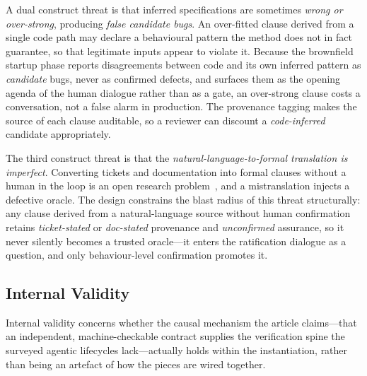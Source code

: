 A dual construct threat is that inferred specifications are sometimes \emph{wrong or over-strong}, producing \emph{false candidate bugs}. An over-fitted clause derived from a single code path may declare a behavioural pattern the method does not in fact guarantee, so that legitimate inputs appear to violate it. Because the brownfield startup phase reports disagreements between code and its own inferred pattern as \emph{candidate} bugs, never as confirmed defects, and surfaces them as the opening agenda of the human dialogue rather than as a gate, an over-strong clause costs a conversation, not a false alarm in production. The provenance tagging makes the source of each clause auditable, so a reviewer can discount a \emph{code-inferred} candidate appropriately.

The third construct threat is that the \emph{natural-language-to-formal translation is imperfect}. Converting tickets and documentation into formal clauses without a human in the loop is an open research problem~\cite{cosler2023nl2spec,endres2024nl2postcond,ma2025specgen}, and a mistranslation injects a defective oracle. The design constrains the blast radius of this threat structurally: any clause derived from a natural-language source without human confirmation retains \emph{ticket-stated} or \emph{doc-stated} provenance and \emph{unconfirmed} assurance, so it never silently becomes a trusted oracle---it enters the ratification dialogue as a question, and only behaviour-level confirmation promotes it.

\subsection{Internal Validity}
\label{subsec:threats-internal}

Internal validity concerns whether the causal mechanism the article claims---that an independent, machine-checkable contract supplies the verification spine the surveyed agentic lifecycles lack---actually holds within the instantiation, rather than being an artefact of how the pieces are wired together.

